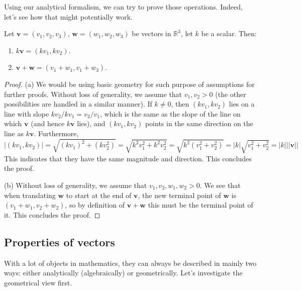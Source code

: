 Using our analytical formalism, we can try to prove those operations. Indeed, let's see how that might potentially work. 
\begin{theorem}
    Let $\mathbf{v}=(v_{1},v_{2},v_{3})$, $\mathbf{w}=(w_{1},w_{2},w_{3})$ be vectors in $\mathbb{R}^{3}$, let $k$ be a scalar. Then: 
    \begin{enumerate}[itemsep=1pt,topsep=0pt]
        \item $k\mathbf{v}=(kv_{1},k v_{2})$. 
        \item $\mathbf{v}+\mathbf{w}=(v_{1}+w_{1},v_{1}+w_{3})$. 
    \end{enumerate}
\end{theorem}
\begin{proof}
    (a) We would be using basic geometry for such purpose of assumptions for further proofs. Without loss of generality, we assume that $v_{1},v_{2}>0$ (the other possibilities are handled in a similar manner). If $k\neq 0$, then $(kv_{1},kv_{2})$ lies on a line with slope $kv_{2}/kv_{1}=v_{2}/v_{1}$, which is the same as the slope of the line on which $\mathbf{v}$ (and hence $k\mathbf{v}$ lies), and $(kv_{1},kv_{2})$ points in the same direction on the line as $k\mathbf{v}$. Furthermore, 
    \begin{equation}
        \lvert (kv_{1},kv_{2}) \rvert = \sqrt{(kv_{1})^{2}+(kv_{2}^{2})} = \sqrt{k^{2}v_{1}^{2} + k^{2}v_{2}^{2}} = \sqrt{k^{2}(v^{2}_{1}+ v_{2}^{2})} = \rvert k \lvert \sqrt{v_{1}^{2}+v_{2}^{2}} = \lvert k \rvert \lvert \lvert \mathbf{v}\rvert \rvert 
    \end{equation}
    This indicates that they have the same magnitude and direction. This concludes the proof. 

    (b) Without loss of generality, we assume that $v_{1},v_{2},w_{1},w_{2}>0$. We see that when translating $\mathbf{w}$ to start at the end of $\mathbf{v}$, the new terminal point of $\mathbf{w}$ is $(v_{1}+w_{1},v_{2}+w_{2})$, so by definition of $\mathbf{v}+\mathbf{w}$ this must be the terminal point of it. This concludes the proof.  
\end{proof}

\subsection{Properties of vectors}
With a lot of objects in mathematics, they can always be described in mainly two ways: either analytically (algebraically) or geometrically. Let's investigate the geometrical view first. 
